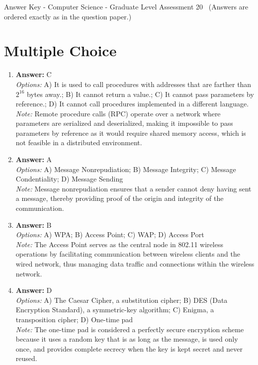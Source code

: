 \documentclass[12pt]{article}
\begin{document}
\begin{center}
Answer Key - Computer Science - Graduate Level Assessment 20 \
\small (Answers are ordered exactly as in the question paper.)
\end{center}

\section*{Multiple Choice}
\begin{enumerate}[label=\arabic*.]
\item \textbf{Answer:} C
\\ \textit{Options:} A) It is used to call procedures with addresses that are farther than $2^16$ bytes away.; B) It cannot return a value.; C) It cannot pass parameters by reference.; D) It cannot call procedures implemented in a different language.
\\ \textit{Note:} Remote procedure calls (RPC) operate over a network where parameters are serialized and deserialized, making it impossible to pass parameters by reference as it would require shared memory access, which is not feasible in a distributed environment.
\item \textbf{Answer:} A
\\ \textit{Options:} A) Message Nonrepudiation; B) Message Integrity; C) Message Condentiality; D) Message Sending
\\ \textit{Note:} Message nonrepudiation ensures that a sender cannot deny having sent a message, thereby providing proof of the origin and integrity of the communication.
\item \textbf{Answer:} B
\\ \textit{Options:} A) WPA; B) Access Point; C) WAP; D) Access Port
\\ \textit{Note:} The Access Point serves as the central node in 802.11 wireless operations by facilitating communication between wireless clients and the wired network, thus managing data traffic and connections within the wireless network.
\item \textbf{Answer:} D
\\ \textit{Options:} A) The Caesar Cipher, a substitution cipher; B) DES (Data Encryption Standard), a symmetric-key algorithm; C) Enigma, a transposition cipher; D) One-time pad
\\ \textit{Note:} The one-time pad is considered a perfectly secure encryption scheme because it uses a random key that is as long as the message, is used only once, and provides complete secrecy when the key is kept secret and never reused.

\end{enumerate}
\end{document}
